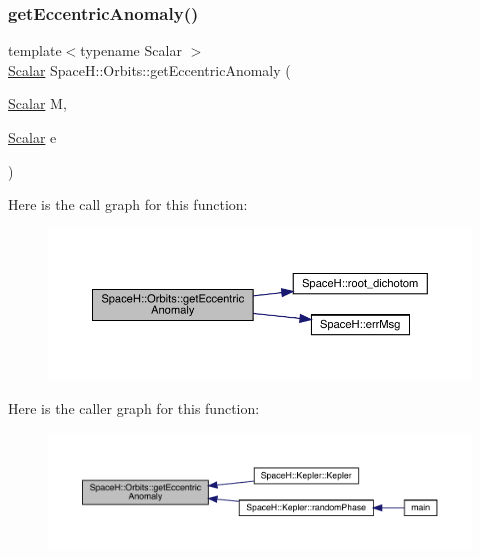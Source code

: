 \mbox{\label{namespace_space_h_1_1_orbits_a729783768420346b170d79aa5e196841}} 
\subsubsection{\texorpdfstring{get\+Eccentric\+Anomaly()}{getEccentricAnomaly()}}
{\footnotesize\ttfamily template$<$typename Scalar $>$ \\
\mbox{\hyperlink{create_kepler_8cpp_a8c2981f3f834be9448a6ab06c28748eb}{Scalar}} Space\+H\+::\+Orbits\+::get\+Eccentric\+Anomaly (\begin{DoxyParamCaption}\item[{\mbox{\hyperlink{create_kepler_8cpp_a8c2981f3f834be9448a6ab06c28748eb}{Scalar}}}]{M,  }\item[{\mbox{\hyperlink{create_kepler_8cpp_a8c2981f3f834be9448a6ab06c28748eb}{Scalar}}}]{e }\end{DoxyParamCaption})}

Here is the call graph for this function\+:
\nopagebreak
\begin{figure}[H]
\begin{center}
\leavevmode
\includegraphics[width=350pt]{namespace_space_h_1_1_orbits_a729783768420346b170d79aa5e196841_cgraph}
\end{center}
\end{figure}
Here is the caller graph for this function\+:
\nopagebreak
\begin{figure}[H]
\begin{center}
\leavevmode
\includegraphics[width=350pt]{namespace_space_h_1_1_orbits_a729783768420346b170d79aa5e196841_icgraph}
\end{center}
\end{figure}
\mbox{\label{namespace_space_h_1_1_orbits_ab0a6bf4bbce5725fa15cc6250057817c}} 
